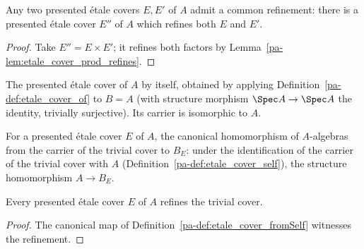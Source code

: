 \begin{theorem}[Directedness]
  \label{pa-thm:etale_cover_exists_refines_prod}
  \leanok

  Any two presented \'etale covers \(E, E'\) of \(A\) admit a common refinement: there is a
  presented \'etale cover \(E''\) of \(A\) which refines both \(E\) and \(E'\).
\end{theorem}
\begin{proof}
  \leanok
  Take \(E'' = E \times E'\); it refines both factors by Lemma~\ref{pa-lem:etale_cover_prod_refines}.
\end{proof}

\begin{definition}
  \label{pa-def:etale_cover_self}
  \leanok

  The presented \'etale cover of \(A\) by itself, obtained by applying
  Definition~\ref{pa-def:etale_cover_of} to \(B = A\) (with structure morphism \(\Spec A \to
  \Spec A\) the identity, trivially surjective). Its carrier is isomorphic to \(A\).
\end{definition}

\begin{definition}
  \label{pa-def:etale_cover_fromSelf}
  \leanok

  For a presented \'etale cover \(E\) of \(A\), the canonical homomorphism of \(A\)-algebras
  from the carrier of the trivial cover to \(B_E\): under the identification of the carrier of
  the trivial cover with \(A\) (Definition~\ref{pa-def:etale_cover_self}), the structure
  homomorphism \(A \to B_E\).
\end{definition}

\begin{lemma}
  \label{pa-lem:etale_cover_refines_self}
  \leanok

  Every presented \'etale cover \(E\) of \(A\) refines the trivial cover.
\end{lemma}
\begin{proof}
  \leanok
  The canonical map of Definition~\ref{pa-def:etale_cover_fromSelf} witnesses the refinement.
\end{proof}


